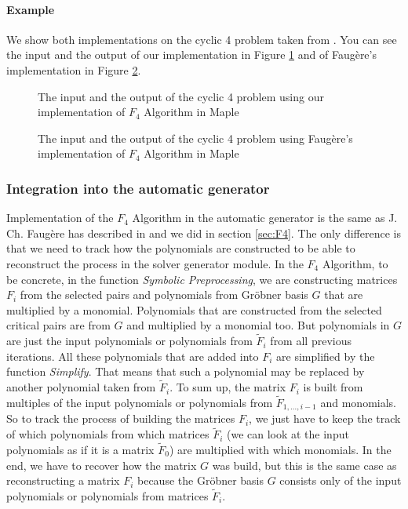 \paragraph{Example} We show both implementations on the cyclic 4 problem taken from \cite{F4}. You can see the input and the output of our implementation in Figure \ref{fig:F4:our} and of Faug\`ere's implementation in Figure \ref{fig:F4:Faug}.

\begin{figure}[!ht]
  \centering
  
  \caption{The input and the output of the cyclic 4 problem using our implementation of $F_4$ Algorithm in Maple}
  \label{fig:F4:our}
\end{figure}

\begin{figure}[!ht]
  \centering
  
  \caption{The input and the output of the cyclic 4 problem using Faug\`ere's implementation of $F_4$ Algorithm in Maple}
  \label{fig:F4:Faug}
\end{figure}

\subsubsection{Integration into the automatic generator}
Implementation of the $F_4$ Algorithm in the automatic generator is the same as J. Ch. Faug\`ere has described in \cite{F4} and we did in section \ref{sec:F4}. The only difference is that we need to track how the polynomials are constructed to be able to reconstruct the process in the solver generator module. In the $F_4$ Algorithm, to be concrete, in the function \textit{Symbolic Preprocessing}, we are constructing matrices $F_i$ from the selected pairs and polynomials from Gr\"obner basis $G$ that are multiplied by a monomial. Polynomials that are constructed from the selected critical pairs are from $G$ and multiplied by a monomial too. But polynomials in $G$ are just the input polynomials or polynomials from $\tilde{F}_i$ from all previous iterations. All these polynomials that are added into $F_i$ are simplified by the function \textit{Simplify}. That means that such a polynomial may be replaced by another polynomial taken from $\tilde{F}_i$. To sum up, the matrix $F_i$ is built from multiples of the input polynomials or polynomials from $\tilde{F}_{1,\dots, i-1}$ and monomials. So to track the process of building the matrices $F_i$, we just have to keep the track of which polynomials from which matrices $\tilde{F}_i$ (we can look at the input polynomials as if it is a matrix $\tilde{F}_0$) are multiplied with which monomials. In the end, we have to recover how the matrix $G$ was build, but this is the same case as reconstructing a matrix $F_i$ because the Gr\"obner basis $G$ consists only of the input polynomials or polynomials from matrices $\tilde{F}_i$.

